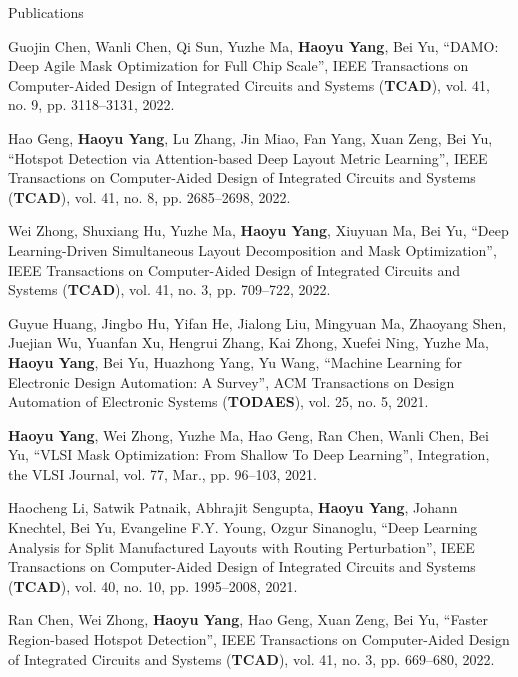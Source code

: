 \begin{rSection}{Publications}
\begin{description}[font=\normalfont]
\item[{[J14]}]{
	Guojin Chen, Wanli Chen, Qi Sun, Yuzhe Ma, \textbf{Haoyu Yang}, Bei Yu,
	``DAMO: Deep Agile Mask Optimization for Full Chip Scale'', 
	IEEE Transactions on Computer-Aided Design of Integrated Circuits and Systems (\textbf{TCAD}), vol. 41, no. 9, pp. 3118–3131, 2022.
}

\item[{[J13]}]{
	Hao Geng, \textbf{Haoyu Yang}, Lu Zhang, Jin Miao, Fan Yang, Xuan Zeng, Bei Yu,
	``Hotspot Detection via Attention-based Deep Layout Metric Learning'', 
	IEEE Transactions on Computer-Aided Design of Integrated Circuits and Systems (\textbf{TCAD}), vol. 41, no. 8, pp. 2685–2698, 2022.
}
	
\item[{[J12]}]{
	Wei Zhong, Shuxiang Hu, Yuzhe Ma, \textbf{Haoyu Yang}, Xiuyuan Ma, Bei Yu,
	``Deep Learning-Driven Simultaneous Layout Decomposition and Mask Optimization'', 
	IEEE Transactions on Computer-Aided Design of Integrated Circuits and Systems (\textbf{TCAD}), vol. 41, no. 3, pp. 709–722, 2022.
}


\item[{[J11]}]{
	Guyue Huang, Jingbo Hu, Yifan He, Jialong Liu, Mingyuan Ma, Zhaoyang Shen, Juejian Wu, Yuanfan Xu, Hengrui Zhang, Kai Zhong, Xuefei Ning, Yuzhe Ma, \textbf{Haoyu Yang}, Bei Yu, Huazhong Yang, Yu Wang,
	``Machine Learning for Electronic Design Automation: A Survey'', 
	ACM Transactions on Design Automation of Electronic Systems (\textbf{TODAES}), vol. 25, no. 5, 2021.
}
	
\item[{[J10]}]{
	\textbf{Haoyu Yang}, Wei Zhong, Yuzhe Ma, Hao Geng, Ran Chen, Wanli Chen, Bei Yu,
	``VLSI Mask Optimization: From Shallow To Deep Learning'', 
	Integration, the VLSI Journal, vol. 77, Mar., pp. 96–103, 2021.
}

\item[{[J9]}]{
	Haocheng Li, Satwik Patnaik, Abhrajit Sengupta, \textbf{Haoyu Yang}, Johann Knechtel, Bei Yu, Evangeline F.Y. Young, Ozgur Sinanoglu, 
	``Deep Learning Analysis for Split Manufactured Layouts with Routing Perturbation'',  
	IEEE Transactions on Computer-Aided Design of Integrated Circuits and Systems (\textbf{TCAD}), vol. 40, no. 10, pp. 1995–2008, 2021.
}
	
\item[{[J8]}]{
	Ran Chen, Wei Zhong, \textbf{Haoyu Yang}, Hao Geng, Xuan Zeng, Bei Yu, ``Faster Region-based Hotspot Detection'',  
	IEEE Transactions on Computer-Aided Design of Integrated Circuits and Systems (\textbf{TCAD}), vol. 41, no. 3, pp. 669–680, 2022. 
}
	

\end{description}
\end{rSection}
